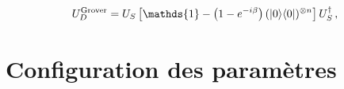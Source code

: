 \begin{equation}
    U_D^{\mathrm{Grover}} = U_{S}\left[ \mathds{1} -\left(1-e^{-i \beta}\right) (\ket{0}\!\bra{0})^{\otimes n} \right] U_{S}^{\dagger} \,,
\end{equation}




\section{Configuration des paramètres}
\label{subsec:initialisation-parametres}

